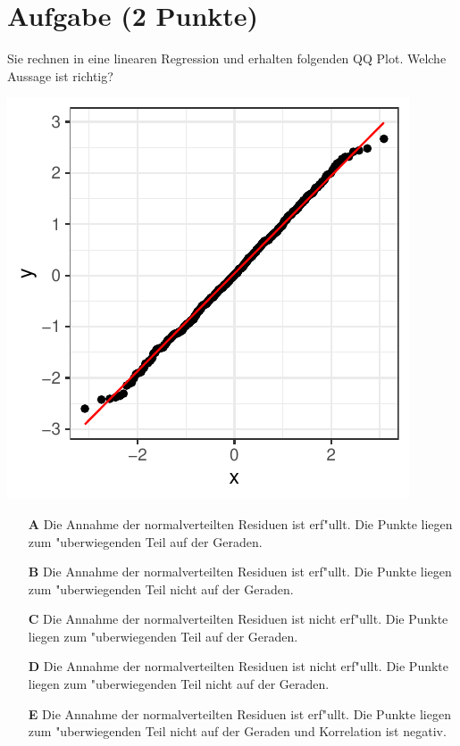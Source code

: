 \documentclass[a4paper, 10pt]{scrartcl}\usepackage[]{graphicx}\usepackage[]{xcolor}
\makeatletter
\def\maxwidth{ %
  \ifdim\Gin@nat@width>\linewidth
    \linewidth
  \else
    \Gin@nat@width
  \fi
}
\makeatother
\begin{document}
\section{Aufgabe \hfill (2 Punkte)}

Sie rechnen in eine linearen Regression und erhalten folgenden QQ
Plot. Welche Aussage ist richtig?




{\centering \includegraphics[width=\maxwidth]{img/mc-regression-05-a-1} 

}







\begin{enumerate}
\item [\textbf{A} \msquare] Die Annahme der normalverteilten Residuen ist erf{"u}llt. Die Punkte liegen zum {"u}berwiegenden Teil auf der Geraden.
\item [\textbf{B} \msquare] Die Annahme der normalverteilten Residuen ist erf{"u}llt. Die Punkte liegen zum {"u}berwiegenden Teil nicht auf der Geraden.
\item [\textbf{C} \msquare] Die Annahme der normalverteilten Residuen ist nicht erf{"u}llt. Die Punkte liegen zum {"u}berwiegenden Teil auf der Geraden.
\item [\textbf{D} \msquare] Die Annahme der normalverteilten Residuen ist nicht erf{"u}llt. Die Punkte liegen zum {"u}berwiegenden Teil nicht auf der Geraden.
\item [\textbf{E} \msquare] Die Annahme der normalverteilten Residuen ist erf{"u}llt. Die Punkte liegen zum {"u}berwiegenden Teil nicht auf der Geraden und Korrelation ist negativ.
\end{enumerate}
\end{document}
